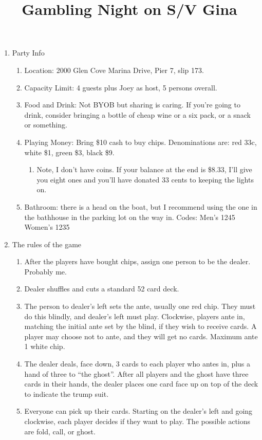 \documentclass[
]{article}
\title{Gambling Night on S/V Gina}
\author{}
\date{}
\begin{document}
\maketitle

\begin{enumerate}
\def\labelenumi{\arabic{enumi}.}
\item
  Party Info

  \begin{enumerate}
  \def\labelenumii{\alph{enumii}.}
  \item    Location: 2000 Glen Cove Marina Drive, Pier 7, slip 173.
  \item Capacity Limit: 4 guests plus Joey as host, 5 persons overall.
  \item Food and Drink: Not BYOB but sharing is caring. If you're going to
    drink, consider bringing a bottle of cheap wine or a six pack, or a
    snack or something.
  \item Playing Money: Bring \$10 cash to buy chips. Denominations are: red
    33c, white \$1, green \$3, black \$9.

    \begin{enumerate}
    \def\labelenumiii{\roman{enumiii}.}
    \item
      Note, I don't have coins. If your balance at the end is \$8.33,
      I'll give you eight ones and you'll have donated 33 cents to
      keeping the lights on.
    \end{enumerate}
  \item
    Bathroom: there is a head on the boat, but I recommend using the one
    in the bathhouse in the parking lot on the way in. Codes: Men's 1245
    Women's 1235
  \end{enumerate}
\item
  The rules of the game

  \begin{enumerate}
  \def\labelenumii{\alph{enumii}.}
  \item
    After the players have bought chips, assign one person to be the
    dealer. Probably me.
  \item
    Dealer shuffles and cuts a standard 52 card deck.
  \item
    The person to dealer's left sets the ante, usually one red chip.
    They must do this blindly, and dealer's left must play. Clockwise,
    players ante in, matching the initial ante set by the blind, if they
    wish to receive cards. A player may choose not to ante, and they
    will get no cards. Maximum ante 1 white chip.
  \item
    The dealer deals, face down, 3 cards to each player who antes in,
    plus a hand of three to ``the ghost''. After all players and the
    ghost have three cards in their hands, the dealer places one card
    face up on top of the deck to indicate the trump suit.
  \item
    Everyone can pick up their cards. Starting on the dealer's left and
    going clockwise, each player decides if they want to play. The
    possible actions are fold, call, or ghost.


\end{enumerate}
\end{enumerate}
\end{document}
